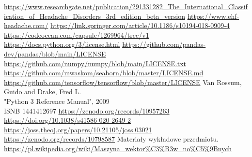 \begin{thebibliography}{10}
     \url{https://www.researchgate.net/publication/291331282_The_International_Classification_of_Headache_Disorders_3rd_edition_beta_version}
     \url{https://www.ehf-headache.com/}
     \url{https://link.springer.com/article/10.1186/s10194-018-0909-4}
     \url{https://codeocean.com/capsule/1269964/tree/v1}
     \url{https://docs.python.org/3/license.html}
     \url{https://github.com/pandas-dev/pandas/blob/main/LICENSE}
     \url{https://github.com/numpy/numpy/blob/main/LICENSE.txt}
     \url{https://github.com/mwaskom/seaborn/blob/master/LICENSE.md}
     \url{https://github.com/tensorflow/tensorflow/blob/master/LICENSE}
     Van Rossum, Guido and Drake, Fred L.\\
    "Python 3 Reference Manual", 2009\\
    ISNB 1441412697
     \url{https://zenodo.org/records/10957263}
     \url{https://doi.org/10.1038/s41586-020-2649-2}
     \url{https://joss.theoj.org/papers/10.21105/joss.03021}
     \url{https://zenodo.org/records/10798587}
     Materiały wykładowe przedmiotu.
     \url{https://pl.wikipedia.org/wiki/Maszyna_wektor%C3%B3w_no%C5%9Bnych}
\end{thebibliography}